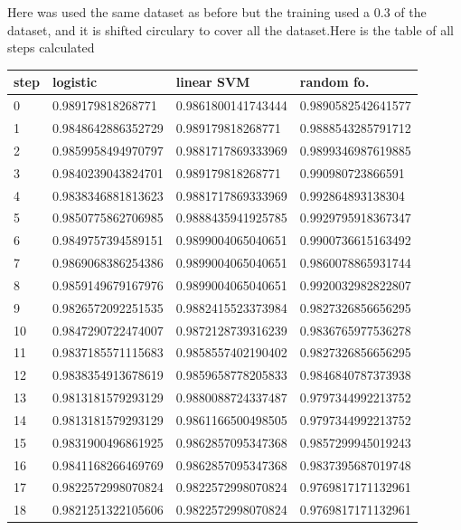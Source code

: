 Here was used the same dataset as before but the training used a 0.3 of the dataset, and it is shifted circulary to cover all the dataset.Here is the table of all steps calculated \\
\begin{longtable} 
{|l |l |l |l |} 
\hline 
step  &logistic  &linear SVM  &random fo.  \\ \hline
0  &0.989179818268771  &0.9861800141743444  &0.9890582542641577  \\ \hline
1  &0.9848642886352729  &0.989179818268771  &0.9888543285791712  \\ \hline
2  &0.9859958494970797  &0.9881717869333969  &0.9899346987619885  \\ \hline
3  &0.9840239043824701  &0.989179818268771  &0.990980723866591  \\ \hline
4  &0.9838346881813623  &0.9881717869333969  &0.992864893138304  \\ \hline
5  &0.9850775862706985  &0.9888435941925785  &0.9929795918367347  \\ \hline
6  &0.9849757394589151  &0.9899004065040651  &0.9900736615163492  \\ \hline
7  &0.9869068386254386  &0.9899004065040651  &0.9860078865931744  \\ \hline
8  &0.9859149679167976  &0.9899004065040651  &0.9920032982822807  \\ \hline
9  &0.9826572092251535  &0.9882415523373984  &0.9827326856656295  \\ \hline
10  &0.9847290722474007  &0.9872128739316239  &0.9836765977536278  \\ \hline
11  &0.9837185571115683  &0.9858557402190402  &0.9827326856656295  \\ \hline
12  &0.9838354913678619  &0.9859658778205833  &0.9846840787373938  \\ \hline
13  &0.9813181579293129  &0.9880088724337487  &0.9797344992213752  \\ \hline
14  &0.9813181579293129  &0.9861166500498505  &0.9797344992213752  \\ \hline
15  &0.9831900496861925  &0.9862857095347368  &0.9857299945019243  \\ \hline
16  &0.9841168266469769  &0.9862857095347368  &0.9837395687019748  \\ \hline
17  &0.9822572998070824  &0.9822572998070824  &0.9769817171132961  \\ \hline
18  &0.9821251322105606  &0.9822572998070824  &0.9769817171132961  \\ \hline

\end{longtable}
